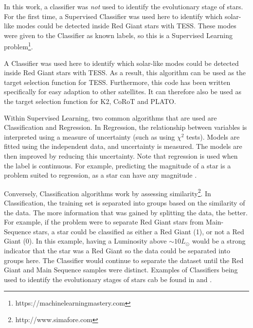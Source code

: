 \documentclass[a4paper,fleqn,usenatbib,useAMS]{mnras}
\newcommand{\pdet}{\ensuremath{P_{\rm det}\:}}
\begin{document}
In this work, a classifier was \textit{not} used to identify the evolutionary stage of stars. For the first time, a Supervised Classifier was used here to identify which solar-like modes could be detected inside Red Giant stars with TESS. These modes were given to the Classifier as known labels, so this is a Supervised Learning problem\footnote{https://machinelearningmastery.com}.

A Classifier was used here to identify which solar-like modes could be detected inside Red Giant stars with TESS. As a result, this algorithm can be used as the target selection function for TESS. Furthermore, this code has been written specifically for easy adaption to other satellites. It can therefore also be used as the target selection function for K2, CoRoT and PLATO.


Within Supervised Learning, two common algorithms that are used are Classification and Regression. In Regression, the relationship between variables is interpreted using a measure of uncertainty (such as using $\chi^{2}$ tests). Models are fitted using the independent data, and uncertainty is measured. The models are then improved by reducing this uncertainty. Note that regression is used when the label is continuous. For example, predicting the magnitude of a star is a problem suited to regression, as a star can have any magnitude \citep{steinhardt_nonparametric_2018}.

Conversely, Classification algorithms work by assessing similarity\footnote{http://www.simafore.com}. In Classification, the training set is separated into groups based on the similarity of the data. The more information that was gained by splitting the data, the better. For example, if the problem were to separate Red Giant stars from Main-Sequence stars, a star could be classified as either a Red Giant (1), or not a Red Giant (0). In this example, having a Luminosity above $\sim10L_{\odot}$ would be a strong indicator that the star was a Red Giant so the data could be separated into groups here. The Classifier would continue to separate the dataset until the Red Giant and Main Sequence samples were distinct. Examples of Classifiers being used to identify the evolutionary stages of stars cab be found in \citet{ness_cannon_2015} and \citet{wu_mass_2017}.
\end{document}
